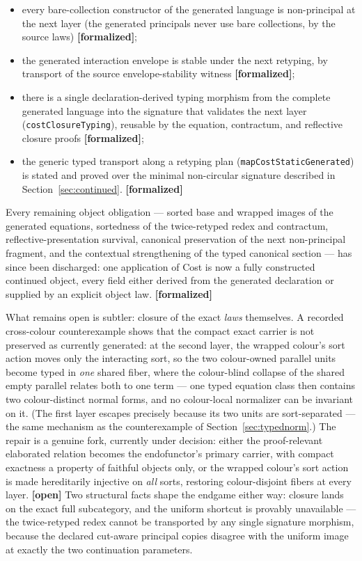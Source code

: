 \documentclass[11pt]{article}
\newcommand{\code}[1]{\texttt{#1}}
\newcommand{\formalized}{\textbf{[formalized]}}
\newcommand{\open}{\textbf{[open]}}
\begin{document}
\begin{itemize}
\item every bare-collection constructor of the generated language is
  non-principal at the next layer (the generated principals never use
  bare collections, by the source laws) \formalized;
\item the generated interaction envelope is stable under the next
  retyping, by transport of the source envelope-stability witness
  \formalized;
\item there is a single declaration-derived typing morphism from the
  complete generated language into the signature that validates the
  next layer (\code{costClosureTyping}), reusable by the equation,
  contractum, and reflective closure proofs \formalized;
\item the generic typed transport along a retyping plan
  (\code{mapCostStaticGenerated}) is stated and proved over the minimal
  non-circular signature described in
  Section~\ref{sec:continued}. \formalized
\end{itemize}

Every remaining object obligation --- sorted base and wrapped images of
the generated equations, sortedness of the twice-retyped redex and
contractum, reflective-presentation survival, canonical preservation of
the next non-principal fragment, and the contextual strengthening of the
typed canonical section --- has since been discharged: one application
of Cost is now a fully constructed continued object, every field either
derived from the generated declaration or supplied by an explicit
object law. \formalized

What remains open is subtler: closure of the exact \emph{laws}
themselves.  A recorded cross-colour counterexample shows that the
compact exact carrier is not preserved as currently generated: at the
second layer, the wrapped colour's sort action moves only the
interacting sort, so the two colour-owned parallel units become typed
in \emph{one} shared fiber, where the colour-blind collapse of the
shared empty parallel relates both to one term --- one typed equation
class then contains two colour-distinct normal forms, and no
colour-local normalizer can be invariant on it.  (The first layer
escapes precisely because its two units are sort-separated --- the same
mechanism as the counterexample of Section~\ref{sec:typednorm}.)  The
repair is a genuine fork, currently under decision: either the
proof-relevant elaborated relation becomes the endofunctor's primary
carrier, with compact exactness a property of faithful objects only, or
the wrapped colour's sort action is made hereditarily injective on
\emph{all} sorts, restoring colour-disjoint fibers at every layer.
\open{} Two structural facts shape the endgame either way: closure
lands on the exact full subcategory, and the uniform shortcut is
provably unavailable --- the twice-retyped redex cannot be transported
by any single signature morphism, because the declared cut-aware
principal copies disagree with the uniform image at exactly the two
continuation parameters.
\end{document}
